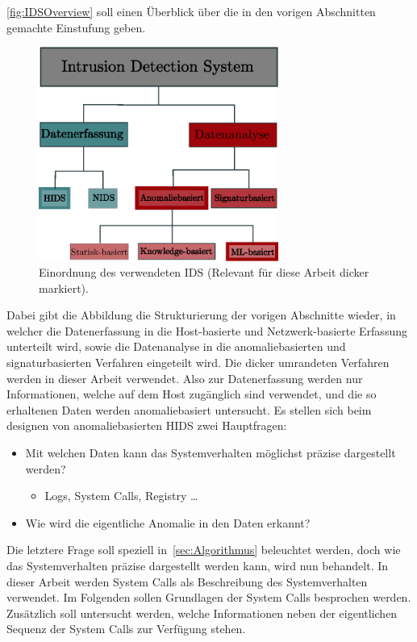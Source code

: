                 \autoref{fig:IDSOverview} soll einen Überblick über die in den vorigen Abschnitten gemachte Einstufung geben.
                \begin{figure}[ht]
                    \centering
                    \includegraphics[width=0.7\textwidth]{images/Illustrationen/IDS/IDSOverview}
                    \caption[Einordnung der Arbeit in die Struktur der \acp{IDS}]{Einordnung des verwendeten \ac{IDS} (Relevant für diese Arbeit dicker markiert).}\label{fig:IDSOverview}
                \end{figure}
                Dabei gibt die Abbildung die Strukturierung der vorigen Abschnitte wieder,
                in welcher die Datenerfassung in die Host-basierte und Netzwerk-basierte Erfassung unterteilt wird, sowie die Datenanalyse %
                in die anomaliebasierten und signaturbasierten Verfahren eingeteilt wird.
                Die dicker umrandeten Verfahren werden in dieser Arbeit verwendet.
                Also zur Datenerfassung werden nur Informationen, welche auf dem Host zugänglich sind verwendet,
                und die so erhaltenen Daten werden anomaliebasiert untersucht.
                Es stellen sich beim designen von anomaliebasierten \ac{HIDS} zwei Hauptfragen:
                \begin{itemize}
                    \item Mit welchen Daten kann das Systemverhalten möglichst präzise dargestellt werden?
                        \begin{itemize}
                            \item Logs, System Calls, Registry \dots~\cite{HIDSSURVEY2019bridges}
                        \end{itemize}
                    \item Wie wird die eigentliche Anomalie in den Daten erkannt?
                \end{itemize}
                Die letztere Frage soll speziell in~\autoref{sec:Algorithmus} beleuchtet werden, doch wie das Systemverhalten präzise dargestellt werden kann, wird nun behandelt.
                In dieser Arbeit werden System Calls als Beschreibung des Systemverhalten verwendet.
                Im Folgenden sollen Grundlagen der System Calls besprochen werden.
                Zusätzlich soll untersucht werden, welche Informationen neben der eigentlichen Sequenz der System Calls zur Verfügung stehen.

